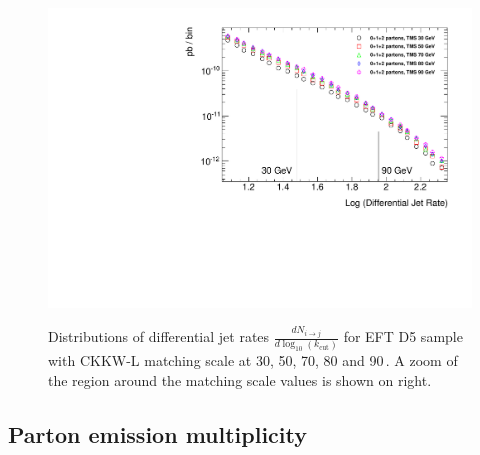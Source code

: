 \begin{figure}[h!]
{		\includegraphics[width=0.48\linewidth]{figures/monojet_appendix/window_plot_3.pdf}
	}
	\hfill
  \caption{Distributions of differential jet rates $\frac{dN_{i\to j}}{d \log_{10}(k_\textrm{cut})}$ for EFT D5 sample with CKKW-L matching scale at 30, 50, 70, 80 and 90\,\gev. A zoom of the region around the matching scale values is shown on right.}
  \label{fig:CKKW_D5_zoom}
\end{figure}




\subsection{Parton emission multiplicity}
\label{sec:monojet_parton_emission}

